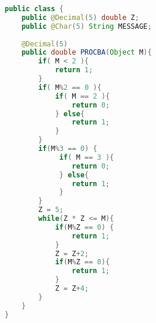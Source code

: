 \begin{lstlisting}[language=Java, caption=Probdivision-Algorhitmus Java, label={lst:javaprobedivision}]
public class { 
	public @Decimal(5) double Z;
	public @Char(5) String MESSAGE;
	
	@Decimal(5)
	public double PROCBA(Object M){
		if( M < 2 ){
			return 1;
		}
		if( M%2 == 0 ){
			if( M == 2 ){
				return 0;
			} else{ 
				return 1;
			}
		} 
		if(M%3 == 0) {
			 if( M == 3 ){
			 	return 0;
			 } else{ 
			 	return 1;
			 }
		}
		Z = 5;
		while(Z * Z <= M){ 
			if(M%Z == 0) {
				return 1;
			}
			Z = Z+2;
			if(M%Z == 0){
				return 1;
			}
			Z = Z+4;
		}
	}
}
\end{lstlisting}